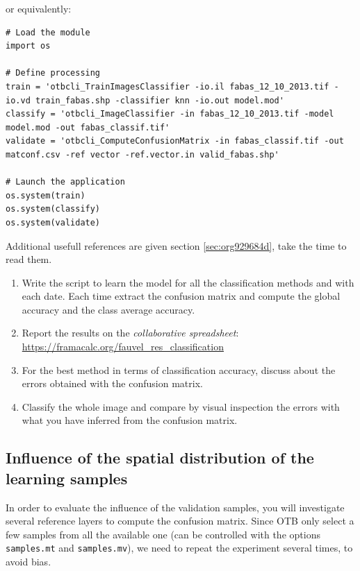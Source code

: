 \documentclass[a4paper,11pt,DIV=18]{scrartcl}
\begin{document}
or equivalently:

\begin{verbatim}
# Load the module
import os

# Define processing
train = 'otbcli_TrainImagesClassifier -io.il fabas_12_10_2013.tif -io.vd train_fabas.shp -classifier knn -io.out model.mod' 
classify = 'otbcli_ImageClassifier -in fabas_12_10_2013.tif -model model.mod -out fabas_classif.tif'
validate = 'otbcli_ComputeConfusionMatrix -in fabas_classif.tif -out matconf.csv -ref vector -ref.vector.in valid_fabas.shp'

# Launch the application
os.system(train)
os.system(classify)
os.system(validate)
\end{verbatim}

Additional usefull references are  given section \ref{sec:org929684d}, take the
time to read them.

\begin{work}
\begin{enumerate}
\item Write  the script  to learn  the model  for all  the classification
methods and with each date.  Each time extract the confusion matrix
and compute the global accuracy and the class average accuracy.
\item Report the results on the \emph{collaborative spreadsheet}: \url{https://framacalc.org/fauvel\_res\_classification}
\item For  the best method  in terms of classification  accuracy, discuss
about the errors obtained with the confusion matrix.
\item Classify the  whole image  and  compare by  visual inspection  the
errors with what you have inferred from the confusion matrix.
\end{enumerate}
\end{work}
\subsection{Influence of the spatial distribution of the learning samples}
\label{sec:orgab397db}
In order to evaluate the influence of the validation samples, you will
investigate  several   reference  layers  to  compute   the  confusion
matrix. Since OTB only select a few samples from all the available one
(can be  controlled with  the options  \texttt{samples.mt} and  \texttt{samples.mv}), we
need to repeat the experiment several times, to avoid bias.
\end{document}
